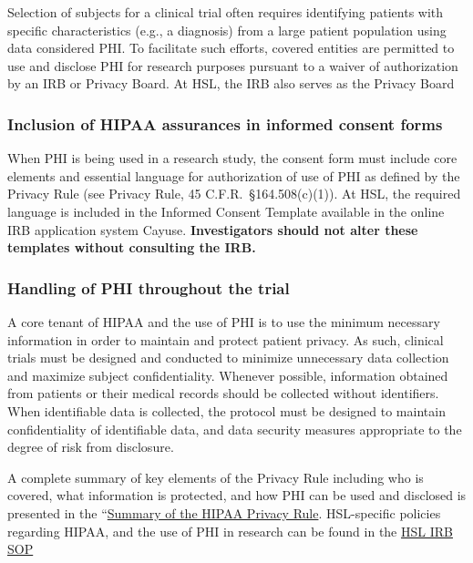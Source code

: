\documentclass[]{book}
\begin{document}
Selection of subjects for a clinical trial often requires identifying
patients with specific characteristics (e.g., a diagnosis) from a large
patient population using data considered PHI. To facilitate such
efforts, covered entities are permitted to use and disclose PHI for
research purposes pursuant to a waiver of authorization by an IRB or
Privacy Board. At HSL, the IRB also serves as the Privacy Board

\subsubsection{Inclusion of HIPAA assurances in informed consent
forms}\label{inclusion-of-hipaa-assurances-in-informed-consent-forms}

When PHI is being used in a research study, the consent form must
include core elements and essential language for authorization of use of
PHI as defined by the Privacy Rule (see Privacy Rule, 45
C.F.R.~§164.508(c)(1)). At HSL, the required language is included in the
Informed Consent Template available in the online IRB application system
Cayuse. \textbf{Investigators should not alter these templates without
consulting the IRB.}

\subsubsection{Handling of PHI throughout the
trial}\label{handling-of-phi-throughout-the-trial}

A core tenant of HIPAA and the use of PHI is to use the minimum
necessary information in order to maintain and protect patient privacy.
As such, clinical trials must be designed and conducted to minimize
unnecessary data collection and maximize subject confidentiality.
Whenever possible, information obtained from patients or their medical
records should be collected without identifiers. When identifiable data
is collected, the protocol must be designed to maintain confidentiality
of identifiable data, and data security measures appropriate to the
degree of risk from disclosure.

A complete summary of key elements of the Privacy Rule including who is
covered, what information is protected, and how PHI can be used and
disclosed is presented in the
``\href{http://www.hhs.gov/hipaa/for-professionals/privacy/laws-regulations/index.html}{Summary
of the HIPAA Privacy Rule}. HSL-specific policies regarding HIPAA, and
the use of PHI in research can be found in the
\href{http://thehslhub/~/media/HSLNet/Docs/IFAR/IRB/IRB_SOP.ashx}{HSL
IRB SOP}
\end{document}
